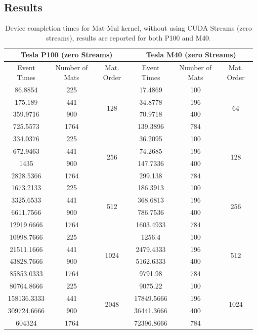 \subsection{Results}
\begin{table}	
	\centering
	\begin{tabular}{ | c c c  || c c c | } 
		\hline
		\multicolumn{3}{c}{\textbf{Tesla P100 (zero Streams)}} & \multicolumn{3}{c}{\textbf{Tesla M40 (zero Streams)}}\\ [0.5ex]
		\hline
		Event Times  & Number of Mats & Mat. Order & Event Times  & Number of Mats & Mat. Order  \\
		\hline\hline
		
		
		86.8854&	225&	\multirow{4}{*}{128}&	17.4869&	100&	\multirow{4}{*}{64}\\
		175.189&	441&	&	34.8778&	196&	\\
		359.9716&	900&	&	70.9718&	400&	\\
		725.5573&	1764&	&	139.3896&	784&	\\
		\hline
		334.0376&	225&	\multirow{4}{*}{256}&	36.2095&	100&	\multirow{4}{*}{128}\\
		672.9463&	441&	&	74.2685&	196&	\\
		1435&	900&	&	147.7336&	400&	\\
		2828.5366&	1764&	&	299.138&	784&	\\
		\hline
		1673.2133&	225&	\multirow{4}{*}{512}&	186.3913&	100&	\multirow{4}{*}{256}\\
		3325.6533&	441&	&	368.6813&	196&	\\
		6611.7566&	900&	&	786.7536&	400&	\\
		12919.6666&	1764&	&	1603.4933&	784& \\
		\hline
		10998.7666&	225&	\multirow{4}{*}{1024}&	1256.4&	100&	\multirow{4}{*}{512}\\
		21511.1666&	441&	&	2479.4333&	196&	\\
		43828.7666&	900&	&	5162.6333&	400&	\\
		85853.0333&	1764&	&	9791.98&	784&	\\
		\hline
		80764.8666&	225&	\multirow{4}{*}{2048}&	9075.22&	100&	\multirow{4}{*}{1024}\\
		158136.3333& 441&	&	17849.5666&	196&	\\
		309724.6666& 900&	&	36441.3666&	400&	\\
		604324&	1764&	&	72396.8666&	784&	\\
		
		\hline
		
	\end{tabular}
	\caption{Device completion times for Mat-Mul kernel, without using CUDA Streams (zero streams), results are reported for both P100 and M40.}	
	\label{tab:matvgszero}		
\end{table}

